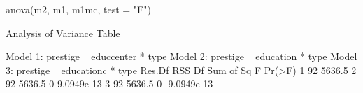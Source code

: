 \begin{Schunk}
\begin{Sinput}
 anova(m2, m1, m1mc, test = "F")
\end{Sinput}
\begin{Soutput}
Analysis of Variance Table

Model 1: prestige ~ educcenter * type
Model 2: prestige ~ education * type
Model 3: prestige ~ educationc * type
  Res.Df    RSS Df   Sum of Sq F Pr(>F)
1     92 5636.5                        
2     92 5636.5  0  9.0949e-13         
3     92 5636.5  0 -9.0949e-13         
\end{Soutput}
\end{Schunk}
